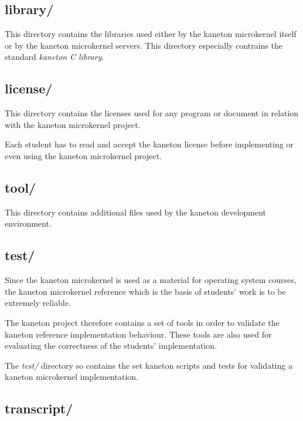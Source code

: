 \subsection*{library/}

This directory contains the libraries used either by the kaneton microkernel
itself or by the kaneton microkernel servers. This directory especially
contrains the standard \textit{kaneton C library}.


\subsection*{license/}

This directory contains the licenses used for any program or document
in relation with the kaneton microkernel project.

Each student has to read and accept the kaneton license before implementing
or even using the kaneton microkernel project.


\subsection*{tool/}

This directory contains additional files used by the kaneton development
environment.


\subsection*{test/}

Since the kaneton microkernel is used as a material for operating system
courses, the kaneton microkernel reference which is the basis of students'
work is to be extremely reliable.

The kaneton project therefore contains a set of tools in order to validate
the kaneton reference implementation behaviour. These tools are also used
for evaluating the correctness of the students' implementation.

The \textit{test/} directory so contains the set kaneton scripts and tests
for validating a kaneton microkernel implementation.


\subsection*{transcript/}

